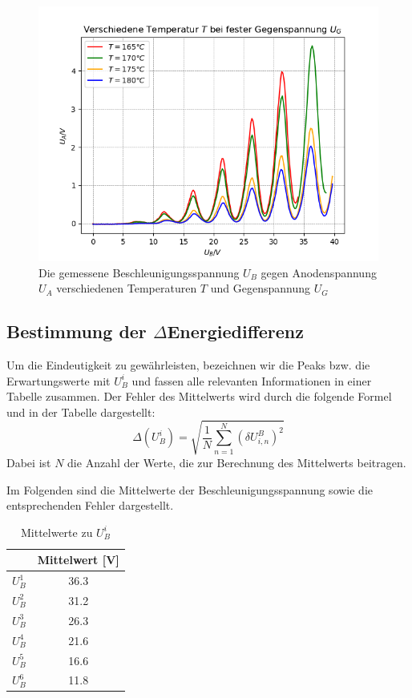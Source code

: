 \documentclass{article}
\begin{document}
\begin{multicols}{2}
\begin{figure}[H]
  \centering
  \includegraphics[scale=0.55]{FH_vieleU.png}
  \caption{Die gemessene Beschleunigungsspannung $U_B$ gegen Anodenspannung $U_A$ 
  verschiedenen Temperaturen $T$ und Gegenspannung $U_G$}
\end{figure}

\subsection*{Bestimmung der $\Delta$Energiedifferenz}
Um die Eindeutigkeit zu gewährleisten, bezeichnen wir die Peaks bzw. die Erwartungswerte mit $U^i_B$ und 
fassen alle relevanten Informationen in einer Tabelle zusammen.
Der Fehler des Mittelwerts wird durch die folgende Formel und in der Tabelle dargestellt:
\begin{equation*}
\Delta(U^i_B) = \sqrt{\frac{1}{N} \sum_{n=1}^{N} \left( \delta U_{i,n}^B \right)^2}
\end{equation*}
Dabei ist \( N \) die Anzahl der Werte, die zur Berechnung des Mittelwerts beitragen.

Im Folgenden sind die Mittelwerte der Beschleunigungsspannung sowie die entsprechenden Fehler dargestellt.
\begin{table}[H]
  \centering
  \begin{tabular}{cc} 
      \hline
      & Mittelwert [V] \\ \hline
      $U^1_B$ & 36.3 \\ \hline
      $U^2_B$ & 31.2 \\ \hline
      $U^3_B$ & 26.3 \\ \hline
      $U^4_B$ & 21.6 \\ \hline
      $U^5_B$ & 16.6 \\ \hline
      $U^6_B$ & 11.8 \\ \hline
  \end{tabular}
  \caption{Mittelwerte zu $U^i_B$}
  \label{tab:median_values}
\end{table}


\end{multicols}
\end{document}
